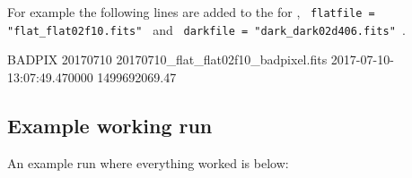\noindent For example the following lines are added to the \calibdb for 
, {\lstinline[style=pythoninline]| flatfile = "flat_flat02f10.fits" |} and {\lstinline[style=pythoninline]| darkfile = "dark_dark02d406.fits" |}. \\

\begin{textbox}[title={In calibration database file}]
BADPIX 20170710 20170710_flat_flat02f10_badpixel.fits 2017-07-10-13:07:49.470000 1499692069.47
\end{textbox}


\newpage
\subsection{Example working run}

An example run where everything worked is below:

